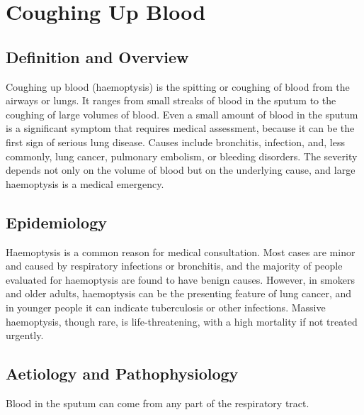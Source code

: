 \chapter{Coughing Up Blood}

\section*{Definition and Overview}
Coughing up blood (haemoptysis) is the spitting or coughing of blood from the airways or lungs. It ranges from small streaks of blood in the sputum to the coughing of large volumes of blood. Even a small amount of blood in the sputum is a significant symptom that requires medical assessment, because it can be the first sign of serious lung disease. Causes include bronchitis, infection, and, less commonly, lung cancer, pulmonary embolism, or bleeding disorders. The severity depends not only on the volume of blood but on the underlying cause, and large haemoptysis is a medical emergency.

\section*{Epidemiology}
Haemoptysis is a common reason for medical consultation. Most cases are minor and caused by respiratory infections or bronchitis, and the majority of people evaluated for haemoptysis are found to have benign causes. However, in smokers and older adults, haemoptysis can be the presenting feature of lung cancer, and in younger people it can indicate tuberculosis or other infections. Massive haemoptysis, though rare, is life-threatening, with a high mortality if not treated urgently.

\section*{Aetiology and Pathophysiology}
Blood in the sputum can come from any part of the respiratory tract.

